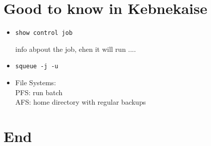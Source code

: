 \documentclass{article}
\begin{document}
\section{Good to know in Kebnekaise}
\begin{itemize}
\item \begin {verbatim}show control job\end{verbatim}  info abpout the job, ehen it will run ....
\item \texttt{squeue -j -u }
\item File Systems:\\
 PFS: run batch \\
  AFS: home directory with regular backups
\end{itemize}
\section{End}
\end{document}

